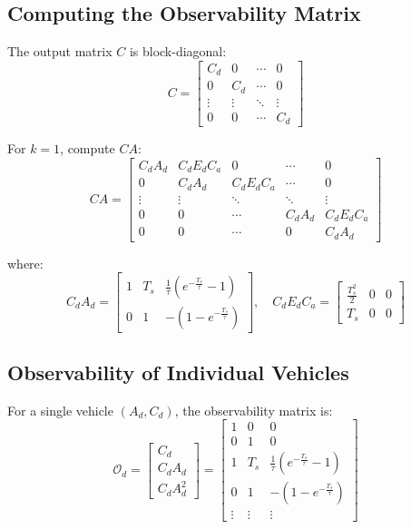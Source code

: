 \documentclass{article}
\begin{document}
\subsection{Computing the Observability Matrix}

The output matrix $C$ is block-diagonal:
\[
C = \begin{bmatrix}
C_d & 0 & \cdots & 0 \\
0 & C_d & \cdots & 0 \\
\vdots & \vdots & \ddots & \vdots \\
0 & 0 & \cdots & C_d
\end{bmatrix}
\]

For $k=1$, compute $CA$:
\[
CA = \begin{bmatrix}
C_d A_d & C_d E_d C_a & 0 & \cdots & 0 \\
0 & C_d A_d & C_d E_d C_a & \cdots & 0 \\
\vdots & \vdots & \ddots & \ddots & \vdots \\
0 & 0 & \cdots & C_d A_d & C_d E_d C_a \\
0 & 0 & \cdots & 0 & C_d A_d
\end{bmatrix}
\]

where:
\[
C_d A_d = \begin{bmatrix} 
1 & T_s & \frac{1}{\tau} (e^{-\frac{T_s}{\tau}} - 1) \\ 
0 & 1 & -(1 - e^{-\frac{T_s}{\tau}}) 
\end{bmatrix}, \quad
C_d E_d C_a = \begin{bmatrix} 
\frac{T_s^2}{2} & 0 & 0 \\ 
T_s & 0 & 0 
\end{bmatrix}
\]

\subsection{Observability of Individual Vehicles}
For a single vehicle $(A_d, C_d)$, the observability matrix is:
\[
\mathcal{O}_d = \begin{bmatrix}
C_d \\
C_d A_d \\
C_d A_d^2
\end{bmatrix} = \begin{bmatrix}
1 & 0 & 0 \\
0 & 1 & 0 \\
1 & T_s & \frac{1}{\tau} (e^{-\frac{T_s}{\tau}} - 1) \\
0 & 1 & -(1 - e^{-\frac{T_s}{\tau}}) \\
\vdots & \vdots & \vdots
\end{bmatrix}
\]
\end{document}
